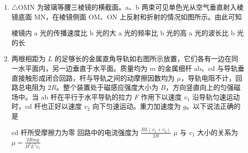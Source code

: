 \documentclass[\gkver]{gaokaozhenti}
\begin{document}
\begin{enumerate}
\onepicture[w=4.61cm]{}

{速率先减小后增大}
{电势能先减小后增大}
{电势能先增大后减小}


\item
$\triangle$OMN 为玻璃等腰三棱镜的横截面。a、b 两束可见单色光从空气垂直射入棱镜底面 MN，在棱镜侧面 OM、ON 上反射和折射的情况如图所示。由此可知

\onepicture[w=5.50cm]{}

{棱镜内 a 光的传播速度比 b 光的大}
{a 光的频率比 b 光的高}
{a 光的波长比 b 光的长}


\item
两根相距为 $L$ 的足够长的金属直角导轨如右图所示放置，它们各有一边在同一水平面内，另一边垂直于水平面。质量均为 $m$ 的金属细杆 ab、cd 与导轨垂直接触形成闭合回路，杆与导轨之间的动摩擦因数均为 $\mu$，导轨电阻不计，回路总电阻为 $2R$。整个装置处于磁感应强度大小为 $B$，方向竖直向上的匀强磁场中。当 ab 杆在平行于水平导轨的拉力 $F$ 作用下以速度 $v_{1}$ 沿导轨匀速运动时，cd 杆也正好以速度 $v_{2}$ 向下匀速运动。重力加速度为 $g$。以下说法正确的是

\onepicture[w=4.85cm]{}

{cd 杆所受摩擦力为零}
{回路中的电流强度为 $\frac{BL(v_{1}+v_{2})}{2R}$}
{$\mu$ 与 $v_{1}$ 大小的关系为 $\mu=\frac{2Rmg}{B^{2}L^{2}v_{1}}$}


\end{enumerate}
\end{document}

